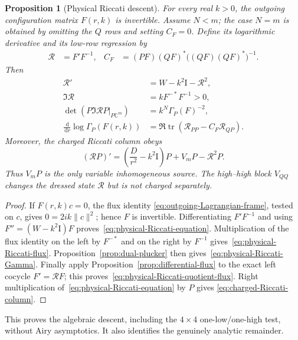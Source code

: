 \documentclass[11pt]{article}
\newcommand{\C}{\mathbb C}
\newcommand{\Id}{\mathrm I}
\newcommand{\dd}{\,\mathrm d}
\DeclareMathOperator{\tr}{tr}
\newtheorem{proposition}[theorem]{Proposition}
\theoremstyle{definition}
\theoremstyle{remark}
\begin{document}
\begin{proposition}[Physical Riccati descent]\label{prop:physical-Riccati-descent}
For every real $k>0$, the outgoing configuration matrix $F(r,k)$ is
invertible.  Assume $N<m$; the case $N=m$ is obtained by omitting the $Q$
rows and setting $C_F=0$.  Define its logarithmic derivative and its low-row regression by
\begin{align}
 \mathcal R&=F'F^{-1},
 &C_F&=(PF)(QF)^*\bigl((QF)(QF)^*\bigr)^{-1}.
 \label{eq:physical-Riccati-variables}
\end{align}
Then
\begin{align}
 \mathcal R'&=W-k^2\Id-\mathcal R^2,
 \label{eq:physical-Riccati-equation}\\
 \Im\mathcal R&=kF^{-*}F^{-1}>0,
 \label{eq:physical-Riccati-flux}\\
 \det\!\left(P\Im\mathcal R P\big|_{P\C^m}\right)
 &=k^N\Gamma_P(F)^{-2},
 \label{eq:physical-Riccati-Gamma}\\
 \frac{\dd}{\dd r}\log\Gamma_P(F(r,k))
 &=\Re\tr\!\left(\mathcal R_{PP}-C_F\mathcal R_{QP}\right).
 \label{eq:physical-Riccati-quotient-flux}
\end{align}
Moreover, the charged Riccati column obeys
\begin{equation}
 (\mathcal RP)'=\left(\frac{D}{r^2}-k^2\Id\right)P
 +V_mP-\mathcal R^2P.
 \label{eq:charged-Riccati-column}
\end{equation}
Thus $V_mP$ is the only variable inhomogeneous source.  The high--high block
$V_{QQ}$ changes the dressed state $\mathcal R$ but is not charged separately.
\end{proposition}

\begin{proof}
If $F(r,k)c=0$, the flux identity
\eqref{eq:outgoing-Lagrangian-frame}, tested on $c$, gives
$0=2ik\|c\|^2$; hence $F$ is invertible.  Differentiating $F'F^{-1}$ and using
$F''=(W-k^2\Id)F$ proves~\eqref{eq:physical-Riccati-equation}.  Multiplication
of the flux identity on the left by $F^{-*}$ and on the right by $F^{-1}$
gives~\eqref{eq:physical-Riccati-flux}.  Proposition~\ref{prop:dual-plucker}
then gives~\eqref{eq:physical-Riccati-Gamma}.  Finally apply
Proposition~\ref{prop:differential-flux} to the exact left cocycle
$F'=\mathcal RF$; this proves~\eqref{eq:physical-Riccati-quotient-flux}.
Right multiplication of~\eqref{eq:physical-Riccati-equation} by $P$ gives
\eqref{eq:charged-Riccati-column}.
\end{proof}

This proves the algebraic descent, including the $4\times4$ one-low/one-high
test, without Airy asymptotics.  It also identifies the genuinely analytic
remainder.
\end{document}

